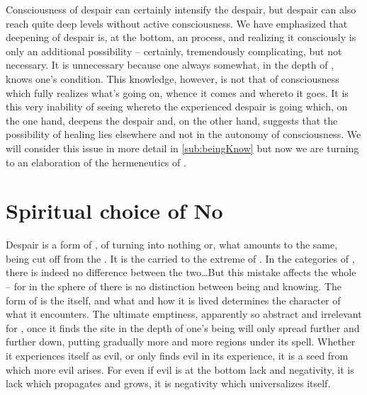 Consciousness of despair can certainly intensify the despair, but despair can
also reach quite deep levels without active consciousness.  We have emphasized
that deepening of despair is, at the bottom, an  process, and
realizing it consciously is only an additional possibility -- certainly,
tremendously complicating, but not necessary.  It is unnecessary because one
always somewhat, in the depth of , knows one's
 condition. This knowledge, however, is not that of 
consciousness which fully realizes what's going on, whence it comes and whereto
it goes. It is this very inability of  seeing whereto the
experienced despair is going which, on the one hand, deepens the despair and, on
the other hand, suggests that the possibility of healing lies elsewhere and not
in the autonomy of consciousness.  We will consider this issue in more detail in
\ref{sub:beingKnow} but now we are turning to an elaboration of the hermeneutics
of \No.


\section{Spiritual choice of No}\label{sec:evil}
\pa\label{pa:evilsSuffer}
Despair is a form of , of turning  into nothing
or, what amounts to the same, being cut off from the . It is the
  carried to the  extreme of
. In the  categories of , there is
indeed no difference between the two\ldots But this  mistake affects
the whole  -- for in the sphere of  there is no
distinction between being and knowing. The form of  is the
 itself, and what and how it is lived determines the
 character of what it encounters. The ultimate emptiness,
apparently so abstract and irrelevant for \herenow, once it finds the site in
the depth of one's being will only spread further and further down, putting
gradually more and more regions under its spell. Whether it experiences itself
as evil, or only finds evil in its experience, it is a seed from which more evil
arises. For even if evil is at the bottom lack and negativity, it is lack which
propagates and grows, it is negativity which universalizes itself.

